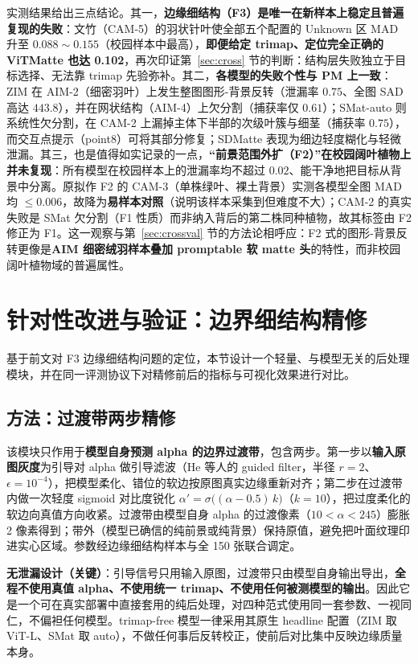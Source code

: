 \documentclass[supercite]{HustGraduPaper}
\begin{document}
	

	实测结果给出三点结论。其一，\textbf{边缘细结构（F3）是唯一在新样本上稳定且普遍复现的失败}：文竹（CAM-5）的羽状针叶使全部五个配置的 Unknown 区 MAD 升至 $0.088\sim0.155$（校园样本中最高），\textbf{即便给定 trimap、定位完全正确的 ViTMatte 也达 0.102}，再次印证第~\ref{sec:cross} 节的判断：结构层失败独立于目标选择、无法靠 trimap 先验弥补。其二，\textbf{各模型的失败个性与 PM 上一致}：ZIM 在 AIM-2（细密羽叶）上发生整图图形-背景反转（泄漏率 $0.75$、全图 SAD 高达 $443.8$），并在网状结构（AIM-4）上欠分割（捕获率仅 $0.61$）；SMat-auto 则系统性欠分割，在 CAM-2 上漏掉主体下半部的次级叶簇与细茎（捕获率 $0.75$），而交互点提示（point8）可将其部分修复；SDMatte 表现为细边轻度糊化与轻微泄漏。其三，也是值得如实记录的一点，\textbf{“前景范围外扩（F2）”在校园阔叶植物上并未复现}：所有模型在校园样本上的泄漏率均不超过 $0.02$、能干净地把目标从背景中分离。原拟作 F2 的 CAM-3（单株绿叶、裸土背景）实测各模型全图 MAD 均 $\leq 0.006$，故降为\textbf{易样本对照}（说明该样本采集到但难度不大）；CAM-2 的真实失败是 SMat 欠分割（F1 性质）而非纳入背后的第二株同种植物，故其标签由 F2 修正为 F1。这一观察与第~\ref{sec:crossval} 节的方法论相呼应：F2 式的图形-背景反转更像是\textbf{AIM 细密绒羽样本叠加 promptable 软 matte 头}的特性，而非校园阔叶植物域的普遍属性。

	\section{针对性改进与验证：边界细结构精修}\label{sec:refine}
	基于前文对 F3 边缘细结构问题的定位，本节设计一个轻量、与模型无关的后处理模块，并在同一评测协议下对精修前后的指标与可视化效果进行对比。

	\subsection{方法：过渡带两步精修}
	该模块只作用于\textbf{模型自身预测 alpha 的边界过渡带}，包含两步。第一步以\textbf{输入原图灰度}为引导对 alpha 做引导滤波（He 等人的 guided filter，半径 $r=2$、$\epsilon=10^{-4}$），把模型柔化、错位的软边按原图真实边缘重新对齐；第二步在过渡带内做一次轻度 sigmoid 对比度锐化 $\alpha' = \sigma\big((\alpha-0.5)\,k\big)$（$k=10$），把过度柔化的软边向真值方向收紧。过渡带由模型自身 alpha 的过渡像素（$10<\alpha<245$）膨胀 2 像素得到；带外（模型已确信的纯前景或纯背景）保持原值，避免把叶面纹理印进实心区域。参数经边缘细结构样本与全 150 张联合调定。

	\textbf{无泄漏设计（关键）}：引导信号只用输入原图，过渡带只由模型自身输出导出，\textbf{全程不使用真值 alpha、不使用统一 trimap、不使用任何被测模型的输出}。因此它是一个可在真实部署中直接套用的纯后处理，对四种范式使用同一套参数、一视同仁，不偏袒任何模型。trimap-free 模型一律采用其原生 headline 配置（ZIM 取 ViT-L、SMat 取 auto），不做任何事后反转校正，使前后对比集中反映边缘质量本身。
\end{document}
